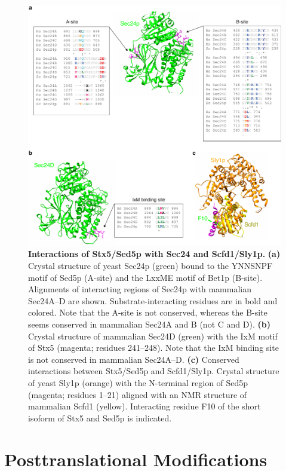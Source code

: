 \begin{figure}
    \includegraphics[width=\textwidth]{chapters/chapter5/chapter5_Figure4}
    \caption{\textbf{Interactions of Stx5/Sed5p with Sec24 and Scfd1/Sly1p.} \textbf{(a)} Crystal structure of yeast Sec24p (green) bound to the YNNSNPF motif of Sed5p (A-site) and the LxxME motif of Bet1p (B-site)\cite{geng_syntaxin_2008}. Alignments of interacting regions of Sec24p with mammalian Sec24A–D are shown. Substrate-interacting residues are in bold and colored. Note that the A-site is not conserved, whereas the B-site seems conserved in mammalian Sec24A and B (not C and D). \textbf{(b)} Crystal structure of mammalian Sec24D (green) with the IxM motif of Stx5 (magenta; residues 241–248)\cite{mancias_structural_2008}. Note that the IxM binding site is not conserved in mammalian Sec24A–D. \textbf{(c)} Conserved interactions between Stx5/Sed5p and Scfd1/Sly1p. Crystal structure of yeast Sly1p (orange) with the N-terminal region of Sed5p (magenta; residues 1–21)\cite{bracher_structural_2002} aligned with an NMR structure of mammalian Scfd1 (yellow)\cite{arac_three-dimensional_2005}. Interacting residue F10 of the short isoform of Stx5 and Sed5p is indicated\cite{arac_three-dimensional_2005,bracher_structural_2002}.}
    \label{fig:ch5fig4}
\end{figure}

\section{Posttranslational Modifications}

